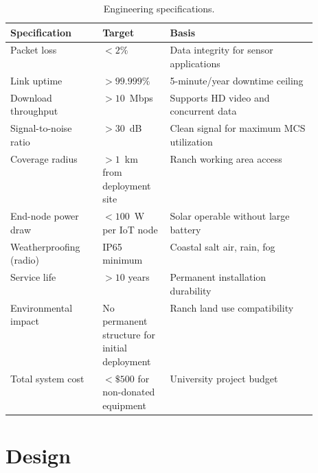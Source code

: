 \documentclass[
    left=1.5in,
    right=1.25in,
    top=1.25in,
    bottom=1.25in
]{CalPolySeniorProject}
\begin{document}
\begin{table}[!htbp]
    \centering
    \caption[Engineering specifications]{Engineering specifications.}
    \vspace{0.5\baselineskip}
    \begin{singlespace}
    \begin{tabularx}{\linewidth}{p{0.30\linewidth}p{0.22\linewidth}X}
        \toprule
        \textbf{Specification} & \textbf{Target} & \textbf{Basis} \\
        \midrule
        Packet loss & $<2\%$ & Data integrity for sensor applications \\
        \addlinespace
        Link uptime & $>99.999\%$ & 5-minute/year downtime ceiling \\
        \addlinespace
        Download throughput & $>10$~Mbps & Supports HD video and concurrent data \\
        \addlinespace
        Signal-to-noise ratio & $>30$~dB & Clean signal for maximum MCS utilization \\
        \addlinespace
        Coverage radius & $>1$~km from deployment site & Ranch working area access \\
        \addlinespace
        End-node power draw & $<100$~W per IoT node & Solar operable without large battery \\
        \addlinespace
        Weatherproofing (radio) & IP65 minimum & Coastal salt air, rain, fog \\
        \addlinespace
        Service life & $>10$ years & Permanent installation durability \\
        \addlinespace
        Environmental impact & No permanent structure for initial deployment & Ranch land use compatibility \\
        \addlinespace
        Total system cost & $<\$500$ for non-donated equipment & University project budget \\
        \bottomrule
    \end{tabularx}
    \end{singlespace}
    \label{tab:engspec}
\end{table}

\section{Design}
\end{document}
